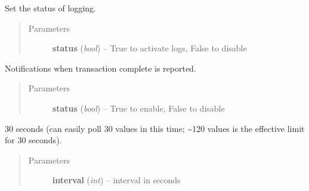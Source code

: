 \documentclass[letterpaper,10pt,english]{sphinxmanual}
\begin{document}
\begin{fulllineitems}
\begin{fulllineitems}
\begin{quote}
\begin{description}
\end{description}\end{quote}

\end{fulllineitems}


\begin{fulllineitems}
\label{option:openzwave.option.ZWaveOption.set_logging}
Set the status of logging.
\begin{quote}\begin{description}
\item[{Parameters}] \leavevmode
\textbf{status} (\emph{bool}) -- True to activate logs, False to disable

\end{description}\end{quote}

\end{fulllineitems}


\begin{fulllineitems}
\label{option:openzwave.option.ZWaveOption.set_notify_transactions}
Notifications when transaction complete is reported.
\begin{quote}\begin{description}
\item[{Parameters}] \leavevmode
\textbf{status} (\emph{bool}) -- True to enable, False to disable

\end{description}\end{quote}

\end{fulllineitems}


\begin{fulllineitems}
\label{option:openzwave.option.ZWaveOption.set_poll_interval}
30 seconds (can easily poll 30 values in this time; \textasciitilde{}120 values is the effective limit for 30 seconds).
\begin{quote}\begin{description}
\item[{Parameters}] \leavevmode
\textbf{interval} (\emph{int}) -- interval in seconds


\end{description}
\end{quote}
\end{fulllineitems}
\end{fulllineitems}
\end{document}
